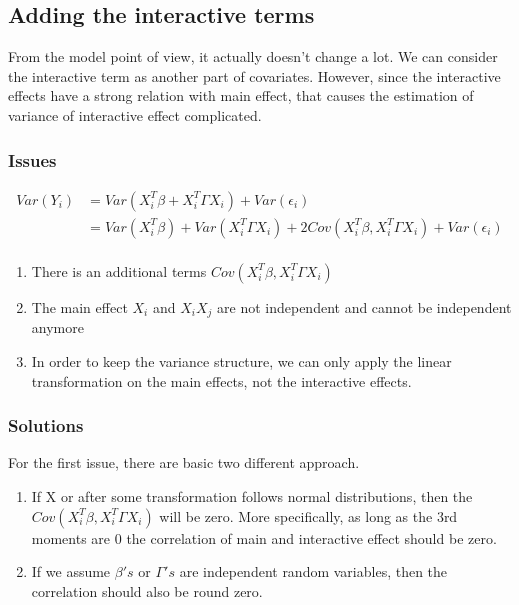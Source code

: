 \documentclass[]{article}
\providecommand{\tightlist}{%
  \setlength{\itemsep}{0pt}\setlength{\parskip}{0pt}}
\begin{document}
\subsection{Adding the interactive
terms}\label{adding-the-interactive-terms}

From the model point of view, it actually doesn't change a lot. We can
consider the interactive term as another part of covariates. However,
since the interactive effects have a strong relation with main effect,
that causes the estimation of variance of interactive effect
complicated.

\subsubsection{Issues}\label{issues}

\begin{align*}
Var(Y_i) &= Var(X_i^T\beta + X_i^T\Gamma X_i) + Var(\epsilon_i) \\
         &= Var(X_i^T\beta) + Var(X_i^T\Gamma X_i) + 2Cov(X_i^T\beta, X_i^T\Gamma X_i) + Var(\epsilon_i) \\
\end{align*}

\begin{enumerate}
\def\labelenumi{\arabic{enumi}.}
\tightlist
\item
  There is an additional terms \(Cov(X_i^T\beta, X_i^T\Gamma X_i)\)
\item
  The main effect \(X_i\) and \(X_i X_j\) are not independent and cannot
  be independent anymore
\item
  In order to keep the variance structure, we can only apply the linear
  transformation on the main effects, not the interactive effects.
\end{enumerate}

\subsubsection{Solutions}\label{solutions}

For the first issue, there are basic two different approach.

\begin{enumerate}
\def\labelenumi{\arabic{enumi}.}
\item
  If X or after some transformation follows normal distributions, then
  the \(Cov(X_i^T\beta, X_i^T\Gamma X_i)\) will be zero. More
  specifically, as long as the 3rd moments are 0 the correlation of main
  and interactive effect should be zero.
\item
  If we assume \(\beta's\) or \(\Gamma's\) are independent random
  variables, then the correlation should also be round zero.
\end{enumerate}
\end{document}
